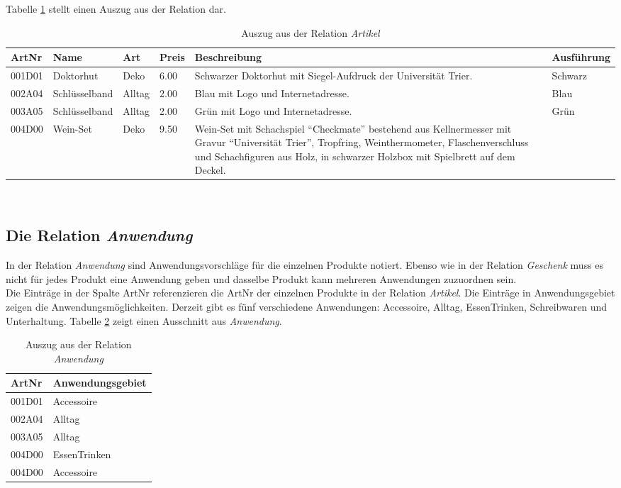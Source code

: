 Tabelle \ref{BspArtikel} stellt einen Auszug aus der Relation dar.
\begin{table}
\begin{center}
\begin{tabular}{|p{}|p{}|p{1cm}|p{}|p{}|p{}|}
	\hline
	ArtNr & Name & Art & Preis & Beschreibung & Ausführung \\ \hline
	001D01 & Doktorhut & Deko & 6.00 & Schwarzer Doktorhut mit Siegel-Aufdruck der Universität Trier. & Schwarz \\
	002A04 & Schlüsselband & Alltag & 2.00 & Blau mit Logo und Internetadresse. & Blau \\
	003A05 & Schlüsselband & Alltag & 2.00 & Grün mit Logo und Internetadresse. & Grün \\
	004D00 & Wein-Set & Deko & 9.50 & Wein-Set mit Schachspiel "`Checkmate"' bestehend aus Kellnermesser mit Gravur "`Universität Trier"', Tropfring, Weinthermometer, Flaschenverschluss und Schachfiguren aus Holz, in schwarzer Holzbox mit Spielbrett auf dem Deckel. & \\ \hline
	\end{tabular}
	\caption{Auszug aus der Relation \textit{Artikel}}
\end{center}
\label{BspArtikel}
\end{table}
\\


\subsection{Die Relation \textit{Anwendung}}
\label{sec:Anwendung}
In der Relation \textit{Anwendung} sind Anwendungsvorschläge für die einzelnen Produkte notiert. Ebenso wie in der Relation \textit{Geschenk} muss es nicht für jedes Produkt eine Anwendung geben und dasselbe Produkt kann mehreren Anwendungen zuzuordnen sein.\\
Die Einträge in der Spalte ArtNr referenzieren die ArtNr der einzelnen Produkte in der Relation \textit{Artikel}. Die Einträge in Anwendungsgebiet zeigen die Anwendungsmöglichkeiten. Derzeit gibt es fünf verschiedene Anwendungen: Accessoire, Alltag, EssenTrinken, Schreibwaren und Unterhaltung.
Tabelle \ref{BspAnwendung} zeigt einen Ausschnitt aus \textit{Anwendung}.
\begin{table}
\begin{center}
\begin{tabular}{|p{}|p{4cm}|}
	\hline
	ArtNr & Anwendungsgebiet \\ \hline
	001D01 & Accessoire \\
	002A04 & Alltag \\
	003A05 & Alltag \\
	004D00 & EssenTrinken\\
	004D00 & Accessoire \\ \hline
	\end{tabular}
	\caption{Auszug aus der Relation \textit{Anwendung}}
\end{center}
\label{BspAnwendung}
\end{table}
\\


